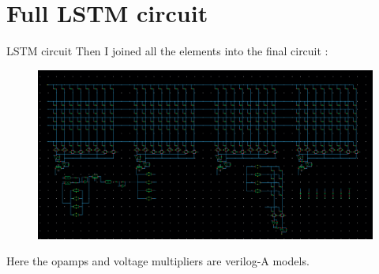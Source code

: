 \documentclass{beamer}
\begin{document}
\section{Full LSTM circuit}

\begin{frame}{LSTM circuit}
  Then I joined all the elements into the final circuit :
  \begin{figure}
    \centering
    \includegraphics[height=0.5\textheight]{figures/LSTM-NP.png}
  \end{figure}
  Here the opamps and voltage multipliers are verilog-A models.
\end{frame}

\end{document}
